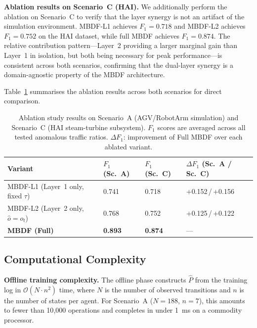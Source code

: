\documentclass[manuscript,screen,review]{acmart}
\begin{document}
\textbf{Ablation results on Scenario~C (HAI).}
We additionally perform the ablation on Scenario~C to
verify that the layer synergy is not an artifact of the
simulation environment. MBDF-L1 achieves $F_1 = 0.718$
and MBDF-L2 achieves $F_1 = 0.752$ on the HAI dataset,
while full MBDF achieves $F_1 = 0.874$. The relative
contribution pattern---Layer~2 providing a larger
marginal gain than Layer~1 in isolation, but both being
necessary for peak performance---is consistent across
both scenarios, confirming that the dual-layer synergy
is a domain-agnostic property of the MBDF architecture.

Table~\ref{tab:ablation} summarises the ablation results
across both scenarios for direct comparison.

\begin{table}[!t]
\renewcommand{\arraystretch}{1.3}
\caption{Ablation study results on Scenario~A (AGV/RobotArm
simulation) and Scenario~C (HAI steam-turbine subsystem).
$F_1$ scores are averaged across all tested anomalous
traffic ratios. $\Delta F_1$: improvement of Full MBDF
over each ablated variant.}
\label{tab:ablation}
\centering
\small
\begin{tabular}{llll}
\toprule
\textbf{Variant} &
\textbf{$F_1$ (Sc.~A)} &
\textbf{$F_1$ (Sc.~C)} &
\textbf{$\Delta F_1$ (Sc.~A / Sc.~C)} \\
\midrule
MBDF-L1 (Layer~1 only, fixed $\tau$) &
  0.741 & 0.718 & $+$0.152\,/\,$+$0.156 \\
MBDF-L2 (Layer~2 only, $\hat{o}=o_{t}$) &
  0.768 & 0.752 & $+$0.125\,/\,$+$0.122 \\
\textbf{MBDF (Full)} &
  \textbf{0.893} & \textbf{0.874} & --- \\
\bottomrule
\end{tabular}
\end{table}

\subsection{Computational Complexity}
\label{sec:complexity}

\textbf{Offline training complexity.}
The offline phase constructs $\hat{P}$ from the training
log in $\mathcal{O}(N \cdot n^2)$ time, where $N$ is the
number of observed transitions and $n$ is the number of
states per agent. For Scenario~A ($N = 188$, $n = 7$),
this amounts to fewer than 10{,}000 operations and
completes in under 1~ms on a commodity processor.
\end{document}
